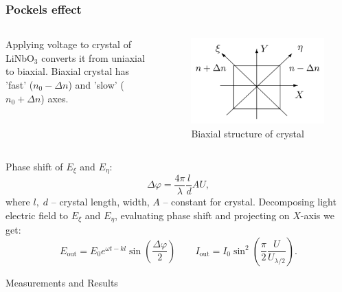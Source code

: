 \documentclass{beamer}
\begin{document}
	\begin{frame}
		\frametitle{Pockels effect}
		
		\begin{columns}
			\begin{column}{0.5\linewidth}
				Applying voltage to crystal of LiNbO$_3$ converts it from uniaxial to biaxial.
				Biaxial crystal has 'fast' ($n_0 - \Delta n$) and 'slow' ($n_0 + \Delta n$) axes.
				
			\end{column}
		
			\begin{column}{0.5\linewidth}
				\begin{figure}
					\centering
					\includegraphics[width=\linewidth]{res/pockels.png}
					\caption{Biaxial structure of crystal}
				\end{figure}
				
			\end{column}
			
		\end{columns}
		\footnotesize
		Phase shift of $E_{\xi}$ and $E_{\eta}$:
		$$ \Delta \varphi = \frac{4\pi}{\lambda} \frac{l}{d} AU,$$
		where $l, \; d$ -- crystal length, width, $A$ -- constant for crystal.
		Decomposing light electric field to $E_{\xi}$ and $E_{\eta}$, evaluating phase shift and projecting on $X$-axis we get:
		$$ E_{\text{out}} = E_0 e^{\omega t - k l} \sin\left(\frac{\Delta \varphi}{2}\right) \qquad I_{\text{out}} = I_0 \sin^2\left(\frac{\pi}{2}\frac{U}{U_{\lambda/2}}\right).$$
	\end{frame}
		
	\begin{frame}[plain,c]	
		\begin{center}
			\huge {} Measurements and Results
		\end{center}
	\end{frame}	
	
\end{document}
